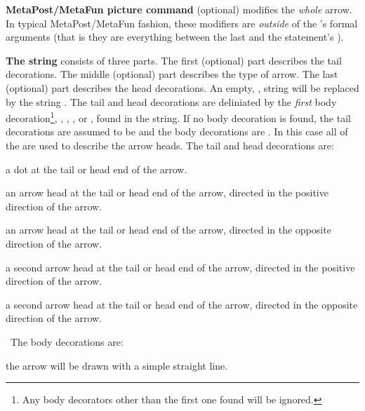 \item {\bf MetaPost/MetaFun picture command} (optional) modifies the 
\emph{whole} arrow. In typical MetaPost/MetaFun fashion, these modifiers 
are \emph{outside} of the 's formal arguments (that is they 
are everything between the last  and the statement's ). 

\stopitemize


{\bf The  string} consists of three parts. The 
first (optional) part describes the tail decorations. The middle 
(optional) part describes the type of arrow. The last (optional) part 
describes the head decorations. An empty, , 
 string will be replaced by the string . 
The tail and head decorations are deliniated by the \emph{first} body 
decoration\footnote{Any body decorators other than the first one found 
will be ignored.}, , , , or , 
found in the string. If no body decoration is found, the tail decorations 
are assumed to be  and the body decorations are . In 
this case all of the  are used to describe the 
arrow heads. The tail and head decorations are: 

\startitemize

\item {} a dot at the tail or head end of the arrow.

\item {} an arrow head at the tail or head end of the arrow, 
directed in the positive direction of the arrow. 

\item {} an arrow head at the tail or head end of the arrow, 
directed in the opposite direction of the arrow.

\item \type{"]"} a second arrow head at the tail or head 
end of the arrow, directed in the positive direction of the arrow. 

\item \type{"["} a second arrow head at the tail or head 
end of the arrow, directed in the opposite direction of the arrow. 

\stopitemize

\noindent\ The body decorations are:

\startitemize

\item {} the arrow will be drawn with a simple straight line.


